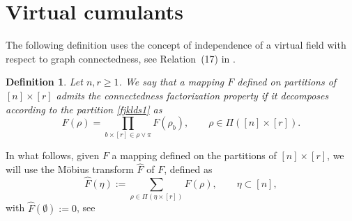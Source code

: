 \documentclass[12pt]{article}
\newcommand{\R}{\mathbb{R}}
\newtheorem{definition}[prop]{Definition}
\numberwithin{equation}{section}
\begin{document}
\section{Virtual cumulants} 
\label{s3}
\noindent
The following definition
uses the concept of independence of a virtual field
with respect to graph connectedness,
see Relation~(17) in \cite[p.~34]{MalyshevMinlos91}. 
\begin{definition}
  Let $n,r\geq 1$.
  We say that a mapping $F$ defined on partitions of
  $[n]\times [r]$
  admits the {\it connectedness factorization} property
  if it decomposes according to the partition \eqref{fjklds1} as 
  \begin{equation}
    \label{dia-factoriz}
  F ( \rho ) = \prod_{b \times [r] \in \rho \vee \pi } F ( \rho_b ),  
  \qquad
   \rho \in \Pi ([n]\times [r]). 
\end{equation}
\end{definition} 
In what follows,
given $F$ a mapping defined on the partitions of
  $[n]\times [r]$, 
  we will use the M\"obius transform
  $\widehat{F}$ of $F$, 
  defined as
\begin{equation}
\nonumber %
  \widehat{F}( \eta ):=\sum_{\rho \in \Pi ( \eta \times [r])} F(\rho ),
  \qquad
  \eta \subset [n],
\end{equation}
with $\widehat{F}(\emptyset):=0$,
see \cite{rota1964} %
\end{document}

